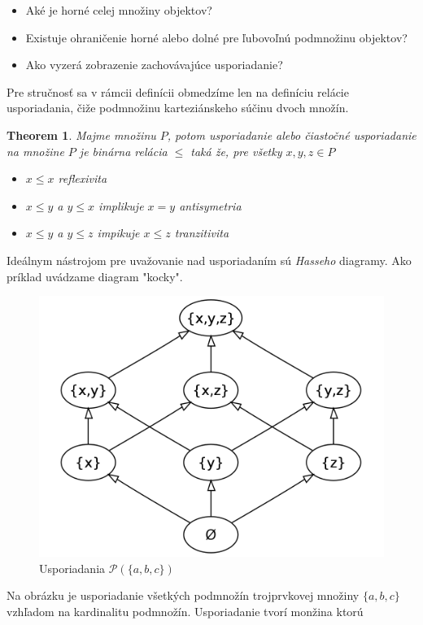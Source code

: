 \documentclass[a4paper,10pt,oneside]{report}%
\newtheorem{theorem}{Theorem}
\begin{document}
\begin{itemize}
    \item Aké je horné celej množiny objektov?
    \item Existuje ohraničenie horné alebo dolné pre ľubovoľnú podmnožinu objektov?
    \item Ako vyzerá zobrazenie zachovávajúce usporiadanie?
\end{itemize}
    Pre stručnosť sa v rámcii definícii obmedzíme len na definíciu relácie usporiadania,
čiže podmnožinu karteziánskeho súčinu dvoch množín.
\begin{theorem}
    Majme množinu $P$, potom usporiadanie alebo čiastočné usporiadanie na množine
    $P$ je binárna relácia $\leq$ taká že, pre všetky $x,y,z \in P$
    \begin{itemize}
        \item $x \leq x$ reflexivita
        \item $x \leq y$ a $y \leq x$ implikuje $x = y$ antisymetria
        \item $x \leq y$ a $y \leq z$ impikuje $x \leq z$ tranzitivita
    \end{itemize}
\end{theorem}
    Ideálnym nástrojom pre uvažovanie nad usporiadaním sú \emph{Hasseho} diagramy.
    Ako príklad uvádzame diagram "kocky".
\begin{figure}[!ht]
    \centering
    \includegraphics[scale=0.20]{cube.png}
    \caption{Usporiadania $\mathcal{P}(\{a,b,c\})$}
\end{figure}

    Na obrázku je usporiadanie všetkých podmnožín trojprvkovej množiny $\{ a,b,c \}$
vzhľadom na kardinalitu podmnožín.
    Usporiadanie tvorí monžina ktorú 
    
\end{document}
